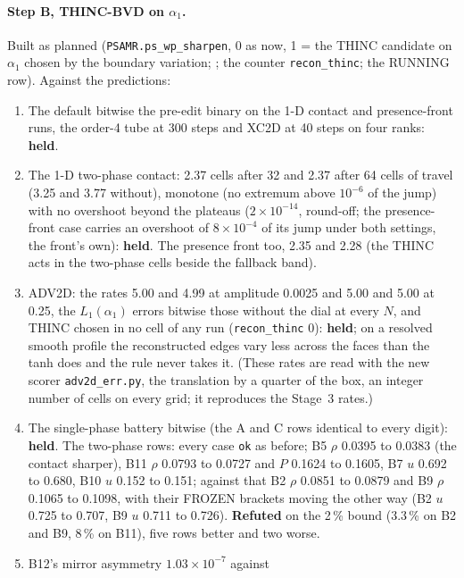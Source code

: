 \documentclass[11pt,a4paper]{article}
\newcommand{\code}[1]{\texttt{\small #1}}
\begin{document}
\paragraph{Step B, THINC-BVD on $\alpha_1$.}  Built as planned
(\code{PSAMR.ps\_wp\_sharpen}, 0 as now, 1 = the THINC candidate on
$\alpha_1$ chosen by the boundary variation; ; the
counter \code{recon\_thinc}; the RUNNING row).  Against the
predictions:
\begin{enumerate}[nosep]
\item The default bitwise the pre-edit binary on the 1-D contact and
      presence-front runs, the order-4 tube at 300 steps and XC2D at 40
      steps on four ranks: \textbf{held}.
\item The 1-D two-phase contact: 2.37 cells after 32 and 2.37 after 64
      cells of travel (3.25 and 3.77 without), monotone (no extremum
      above $10^{-6}$ of the jump) with no overshoot beyond the plateaus
      ($2\times10^{-14}$, round-off; the presence-front case carries an
      overshoot of $8\times10^{-4}$ of its jump under both settings, the
      front's own): \textbf{held}.
      The presence front too, 2.35 and 2.28 (the THINC acts in the
      two-phase cells beside the fallback band).
\item ADV2D: the rates 5.00 and 4.99 at amplitude 0.0025 and 5.00 and 5.00 at 0.25, the $L_1(\alpha_1)$ errors bitwise those without the dial at every $N$, and THINC chosen in no cell of any run (\code{recon\_thinc} 0): \textbf{held}; on a resolved smooth profile the reconstructed edges vary less across the faces than the tanh does and the rule never takes it.  (These rates are read with the new scorer \code{adv2d\_err.py}, the translation by a quarter of the box, an integer number of cells on every grid; it reproduces the Stage~3 rates.)
\item The single-phase battery bitwise (the A and C rows identical to
      every digit): \textbf{held}.  The two-phase rows: every case
      \code{ok} as before; B5 $\rho$ 0.0395 to 0.0383 (the contact
      sharper), B11 $\rho$ 0.0793 to 0.0727 and $P$ 0.1624 to 0.1605,
      B7 $u$ 0.692 to 0.680, B10 $u$ 0.152 to 0.151; against that B2
      $\rho$ 0.0851 to 0.0879 and B9 $\rho$ 0.1065 to 0.1098, with
      their FROZEN brackets moving the other way (B2 $u$ 0.725 to
      0.707, B9 $u$ 0.711 to 0.726).  \textbf{Refuted} on the 2\,\%
      bound (3.3\,\% on B2 and B9, 8\,\% on B11), five rows better and
      two worse.
\item B12's mirror asymmetry $1.03\times10^{-7}$ against

\end{enumerate}
\end{document}
